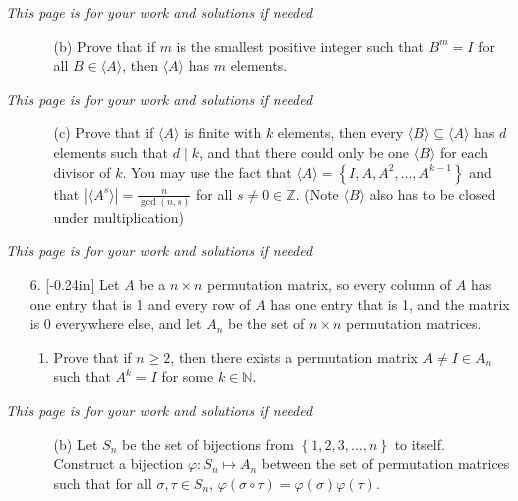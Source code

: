 \documentclass[letterpaper,12pt]{article}
\newcommand{\set}[1]{\left\{ #1 \right\}}
\theoremstyle{definition}
\begin{document}
\pagebreak
\textit{This page is for your work and solutions if needed}

\pagebreak
\begin{enumerate}
    \item[] \begin{enumerate}
        \item[(b)] Prove that if $m$ is the smallest positive integer such that $B^m = I$ for all $B \in \langle A \rangle$, then $\langle A \rangle$ has $m$ elements.
    \end{enumerate}
\end{enumerate}
\pagebreak
\textit{This page is for your work and solutions if needed}

\pagebreak
\begin{enumerate}
    \item[] \begin{enumerate}
        \item[(c)] Prove that if $\langle A \rangle$ is finite with $k$ elements, then every $\langle B \rangle \subseteq \langle A \rangle$ has $d$ elements such that $d \mid k$, and that there could only be one $\langle B \rangle$ for each divisor of $k$. You may use the fact that $\langle A \rangle = \set{I, A, A^2, \ldots, A^{k-1}}$ and that $| \langle A^s \rangle | = \frac{n}{\gcd (n,s)}$ for all $s \neq 0 \in \mathbb{Z}$. (Note $\langle B \rangle$ also has to be closed under multiplication)

    \end{enumerate}
\end{enumerate}
\pagebreak
\textit{This page is for your work and solutions if needed}
\pagebreak
\begin{enumerate}
    \item[6.] \reversemarginpar{}[-0.24in] Let $A$ be a $n \times n$ permutation matrix, so every column of $A$ has one entry that is 1 and every row of $A$ has one entry that is 1, and the matrix is 0 everywhere else, and let $A_n$ be the set of $n \times n$ permutation matrices. \begin{enumerate}
        \item Prove that if $n \geq 2$, then there exists a permutation matrix $A \neq I \in A_n$ such that $A^k = I$ for some $k \in \mathbb{N}$.
    \end{enumerate}
\end{enumerate}
\pagebreak
\textit{This page is for your work and solutions if needed}
\pagebreak
\begin{enumerate}
    \item[] \begin{enumerate}
        \item[(b)] Let $S_n$ be the set of bijections from $\set{1,2,3,\ldots,n}$ to itself. Construct a bijection $\varphi: S_n \mapsto A_n$ between the set of permutation matrices such that for all $\sigma,\tau \in S_n$, $\varphi(\sigma \circ \tau) = \varphi(\sigma)\varphi(\tau)$.
    \end{enumerate}
\end{enumerate}
\end{document}
